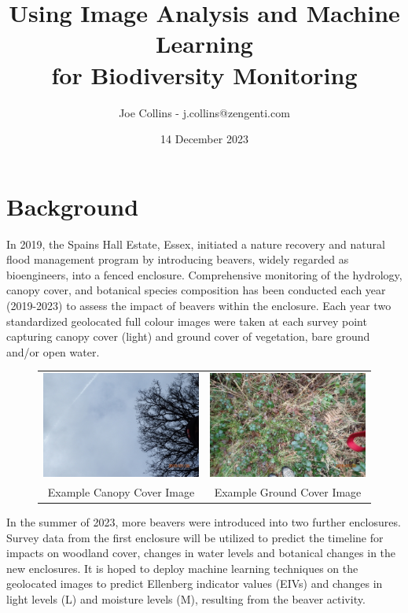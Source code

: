 \documentclass{roles}
\title{Using Image Analysis and Machine Learning\\for Biodiversity Monitoring}
\author{Joe Collins - j.collins@zengenti.com}
\date{14 December 2023}
\begin{document}
\maketitle

\section*{Background}

In 2019, the Spains Hall Estate, Essex,
initiated a nature recovery and natural flood management program by introducing beavers, widely regarded as bioengineers,
into a fenced enclosure.
Comprehensive monitoring of the hydrology, canopy cover, and botanical species composition has been conducted
each year (2019-2023) to assess the impact of beavers within the enclosure.
Each year two standardized geolocated full colour images were taken at each survey point
capturing canopy cover (light) and ground cover of vegetation,
bare ground and/or open water.

\begin{figure}[H]
  \centering
  \begin{tabular}{cc}
    \includegraphics[width=0.45\linewidth]{../images/survey-up.jpg} &
    \includegraphics[width=0.45\linewidth]{../images/survey-down.jpg} \\
    Example Canopy Cover Image & Example Ground Cover Image\\
  \end{tabular}
\end{figure}

In the summer of 2023, more beavers were introduced into two further enclosures.
Survey data from the first enclosure will be utilized
to predict the timeline for impacts on woodland cover, changes in water levels and botanical changes in the new enclosures.
It is hoped to deploy machine learning techniques on the geolocated images
to predict Ellenberg indicator values (EIVs) and changes in light levels (L) and moisture levels (M), resulting from the beaver activity.
\end{document}
